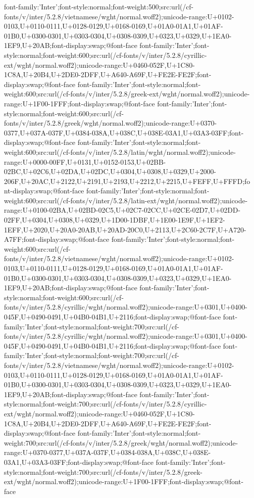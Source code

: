 {font-family:'Inter';font-style:normal;font-weight:500;src:url(/cf-fonts/v/inter/5.2.8/vietnamese/wght/normal.woff2);unicode-range:U+0102-0103,U+0110-0111,U+0128-0129,U+0168-0169,U+01A0-01A1,U+01AF-01B0,U+0300-0301,U+0303-0304,U+0308-0309,U+0323,U+0329,U+1EA0-1EF9,U+20AB;font-display:swap;}@font-face {font-family:'Inter';font-style:normal;font-weight:600;src:url(/cf-fonts/v/inter/5.2.8/cyrillic-ext/wght/normal.woff2);unicode-range:U+0460-052F,U+1C80-1C8A,U+20B4,U+2DE0-2DFF,U+A640-A69F,U+FE2E-FE2F;font-display:swap;}@font-face {font-family:'Inter';font-style:normal;font-weight:600;src:url(/cf-fonts/v/inter/5.2.8/greek-ext/wght/normal.woff2);unicode-range:U+1F00-1FFF;font-display:swap;}@font-face {font-family:'Inter';font-style:normal;font-weight:600;src:url(/cf-fonts/v/inter/5.2.8/greek/wght/normal.woff2);unicode-range:U+0370-0377,U+037A-037F,U+0384-038A,U+038C,U+038E-03A1,U+03A3-03FF;font-display:swap;}@font-face {font-family:'Inter';font-style:normal;font-weight:600;src:url(/cf-fonts/v/inter/5.2.8/latin/wght/normal.woff2);unicode-range:U+0000-00FF,U+0131,U+0152-0153,U+02BB-02BC,U+02C6,U+02DA,U+02DC,U+0304,U+0308,U+0329,U+2000-206F,U+20AC,U+2122,U+2191,U+2193,U+2212,U+2215,U+FEFF,U+FFFD;font-display:swap;}@font-face {font-family:'Inter';font-style:normal;font-weight:600;src:url(/cf-fonts/v/inter/5.2.8/latin-ext/wght/normal.woff2);unicode-range:U+0100-02BA,U+02BD-02C5,U+02C7-02CC,U+02CE-02D7,U+02DD-02FF,U+0304,U+0308,U+0329,U+1D00-1DBF,U+1E00-1E9F,U+1EF2-1EFF,U+2020,U+20A0-20AB,U+20AD-20C0,U+2113,U+2C60-2C7F,U+A720-A7FF;font-display:swap;}@font-face {font-family:'Inter';font-style:normal;font-weight:600;src:url(/cf-fonts/v/inter/5.2.8/vietnamese/wght/normal.woff2);unicode-range:U+0102-0103,U+0110-0111,U+0128-0129,U+0168-0169,U+01A0-01A1,U+01AF-01B0,U+0300-0301,U+0303-0304,U+0308-0309,U+0323,U+0329,U+1EA0-1EF9,U+20AB;font-display:swap;}@font-face {font-family:'Inter';font-style:normal;font-weight:600;src:url(/cf-fonts/v/inter/5.2.8/cyrillic/wght/normal.woff2);unicode-range:U+0301,U+0400-045F,U+0490-0491,U+04B0-04B1,U+2116;font-display:swap;}@font-face {font-family:'Inter';font-style:normal;font-weight:700;src:url(/cf-fonts/v/inter/5.2.8/cyrillic/wght/normal.woff2);unicode-range:U+0301,U+0400-045F,U+0490-0491,U+04B0-04B1,U+2116;font-display:swap;}@font-face {font-family:'Inter';font-style:normal;font-weight:700;src:url(/cf-fonts/v/inter/5.2.8/vietnamese/wght/normal.woff2);unicode-range:U+0102-0103,U+0110-0111,U+0128-0129,U+0168-0169,U+01A0-01A1,U+01AF-01B0,U+0300-0301,U+0303-0304,U+0308-0309,U+0323,U+0329,U+1EA0-1EF9,U+20AB;font-display:swap;}@font-face {font-family:'Inter';font-style:normal;font-weight:700;src:url(/cf-fonts/v/inter/5.2.8/cyrillic-ext/wght/normal.woff2);unicode-range:U+0460-052F,U+1C80-1C8A,U+20B4,U+2DE0-2DFF,U+A640-A69F,U+FE2E-FE2F;font-display:swap;}@font-face {font-family:'Inter';font-style:normal;font-weight:700;src:url(/cf-fonts/v/inter/5.2.8/greek/wght/normal.woff2);unicode-range:U+0370-0377,U+037A-037F,U+0384-038A,U+038C,U+038E-03A1,U+03A3-03FF;font-display:swap;}@font-face {font-family:'Inter';font-style:normal;font-weight:700;src:url(/cf-fonts/v/inter/5.2.8/greek-ext/wght/normal.woff2);unicode-range:U+1F00-1FFF;font-display:swap;}@font-face 